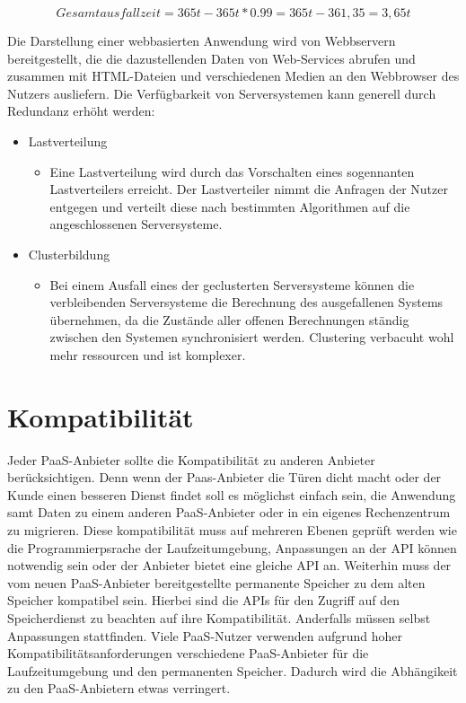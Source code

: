 \documentclass[a4paper,10pt]{article}
\begin{document}
$$ Gesamtausfallzeit = 365t - 365t * 0.99 = 365t - 361,35 = 3,65t $$ \newline


\vspace{3mm}
Die Darstellung einer webbasierten Anwendung wird von Webbservern bereitgestellt, die die dazustellenden Daten von Web-Services abrufen und zusammen mit HTML-Dateien und verschiedenen Medien an den Webbrowser des Nutzers ausliefern. Die Verfügbarkeit von Serversystemen kann generell durch Redundanz erhöht werden:
\begin{itemize}
	\item Lastverteilung
		\begin{itemize}
			\item Eine Lastverteilung wird durch das Vorschalten eines sogennanten Lastverteilers erreicht. Der Lastverteiler nimmt die Anfragen der Nutzer entgegen und verteilt diese nach bestimmten Algorithmen auf die angeschlossenen Serversysteme.
		\end{itemize}


	\item Clusterbildung
		\begin{itemize}
			\item Bei einem Ausfall eines der geclusterten Serversysteme können die verbleibenden Serversysteme die Berechnung des ausgefallenen Systems übernehmen, da die Zustände aller offenen Berechnungen ständig zwischen den Systemen synchronisiert werden. Clustering verbacuht wohl mehr ressourcen und ist komplexer.
		\end{itemize}
\end{itemize}

\section{Kompatibilität}
Jeder PaaS-Anbieter sollte die Kompatibilität zu anderen Anbieter berücksichtigen. Denn wenn der Paas-Anbieter die Türen dicht macht oder der Kunde einen besseren Dienst findet soll es möglichst einfach sein, die Anwendung samt Daten zu einem anderen PaaS-Anbieter oder in ein eigenes Rechenzentrum zu migrieren. Diese kompatibilität muss auf mehreren Ebenen geprüft werden wie die Programmierpsrache der Laufzeitumgebung, Anpassungen an der API können notwendig sein oder der Anbieter bietet eine gleiche API an. Weiterhin muss der vom neuen PaaS-Anbieter bereitgestellte permanente Speicher zu dem alten Speicher kompatibel sein. Hierbei sind die APIs für den Zugriff auf den Speicherdienst zu beachten auf ihre Kompatibilität. Anderfalls müssen selbst Anpassungen stattfinden. Viele PaaS-Nutzer verwenden aufgrund hoher Kompatibilitätsanforderungen verschiedene PaaS-Anbieter für die Laufzeitumgebung und den permanenten Speicher. Dadurch wird die Abhängikeit zu den PaaS-Anbietern etwas verringert.
\end{document}
